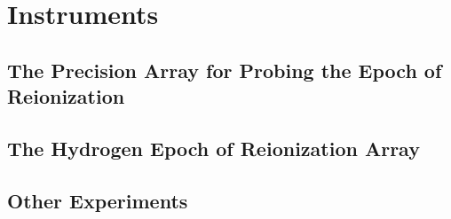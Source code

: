 \section{Instruments}
\subsection{The Precision Array for Probing the Epoch of Reionization}
\subsection{The Hydrogen Epoch of Reionization Array}
\subsection{Other Experiments}

\nocite{*}






